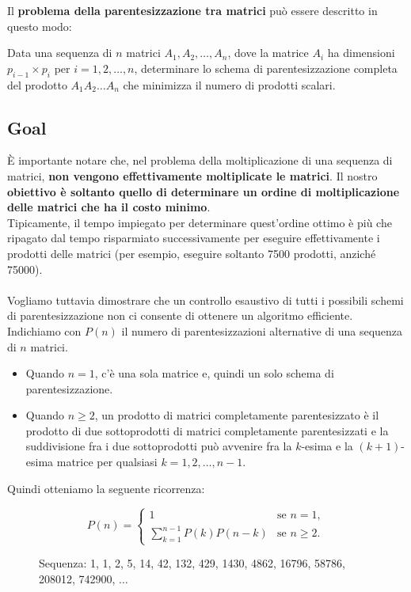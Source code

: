 Il \textbf{problema della parentesizzazione tra matrici} può essere
descritto in questo modo:
\begin{myblockquote}
  Data una sequenza di $n$
  matrici $A_1, A_2, \ldots, A_n$, dove la matrice $A_i$ ha dimensioni
  $p_{i-1} \times p_i$ per $i = 1,2, \ldots,n$, determinare lo schema di
  parentesizzazione completa del prodotto $A_1A_2 \ldots A_n$ che minimizza
  il numero di prodotti scalari.
\end{myblockquote}


\subsection{Goal}

È importante notare che, nel problema della moltiplicazione di una
sequenza di matrici, \textbf{non vengono effettivamente moltiplicate le
  matrici}. Il nostro \textbf{obiettivo è soltanto quello di determinare
  un ordine di moltiplicazione delle matrici che ha il costo minimo}.\\
Tipicamente, il tempo impiegato per determinare quest'ordine ottimo è
più che ripagato dal tempo risparmiato successivamente per eseguire
effettivamente i prodotti delle matrici (per esempio, eseguire soltanto
7500 prodotti, anziché 75000).\\
\\
Vogliamo tuttavia dimostrare che un controllo esaustivo di tutti i
possibili schemi di parentesizzazione non ci consente di ottenere un
algoritmo efficiente. Indichiamo con $P(n)$ il numero di
parentesizzazioni alternative di una sequenza di $n$ matrici.
\begin{itemize}
  \item Quando
        $n=1$, c'è una sola matrice e, quindi un solo schema di
        parentesizzazione.
  \item Quando $n \ge 2$, un prodotto di matrici
        completamente parentesizzato è il prodotto di due sottoprodotti di
        matrici completamente parentesizzati e la suddivisione fra i due
        sottoprodotti può avvenire fra la $k$-esima e la $(k+1)$-esima matrice per
        qualsiasi $k=1,2,\ldots,n-1$.
\end{itemize}

Quindi otteniamo la seguente ricorrenza:

\begin{figure}[H]
  \begin{equation*}
    P(n) = \begin{cases}
      1                           & \text{se } n = 1,    \\
      \sum_{k=1}^{n-1} P(k)P(n-k) & \text{se } n \geq 2.
    \end{cases}
  \end{equation*}

  \caption{Sequenza: 1, 1, 2, 5, 14, 42, 132, 429, 1430, 4862, 16796, 58786, 208012, 742900,
    $\ldots$}
\end{figure}


